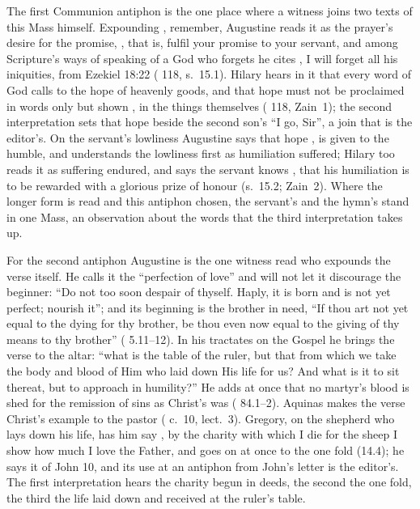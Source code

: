 The first Communion antiphon is the one place where a witness joins two texts
of this Mass himself. Expounding , remember, Augustine reads it as the
prayer's desire for the promise, ,
that is, fulfil your promise to your servant, and among Scripture's ways of
speaking of a God who forgets he cites , I will forget all his iniquities, from Ezekiel 18:22
( 118, s.~15.1). Hilary hears in it that
every word of God calls to the hope of heavenly goods, and that hope must not
be proclaimed in words only but shown , in the things
themselves ( 118, Zain~1); the second
interpretation sets that hope beside the second son's ``I go, Sir'', a join that
is the editor's. On the servant's lowliness Augustine says that hope
, is given to the humble, and understands the
lowliness first as humiliation suffered; Hilary too reads it as suffering
endured, and says the servant knows , that his humiliation is to be rewarded with a
glorious prize of honour (s.~15.2; Zain~2). Where the
longer form is read and this antiphon chosen, the servant's
 and the hymn's  stand in one
Mass, an observation about the words
that the third interpretation takes up.

For the second antiphon Augustine is the one witness read who expounds the
verse itself. He calls it the ``perfection of love'' and will not let it discourage
the beginner: ``Do not too soon despair of thyself. Haply, it is born and is
not yet perfect; nourish it''; and its beginning is the brother in need, ``If
thou art not yet equal to the dying for thy brother, be thou even now equal to
the giving of thy means to thy brother'' ( 5.11--12). In his tractates on the Gospel he brings the verse to the
altar: ``what is the table of the ruler, but that from which we take the body
and blood of Him who laid down His life for us? And what is it to sit thereat,
but to approach in humility?'' He adds at once that no martyr's blood is shed
for the remission of sins as Christ's was ( 84.1--2).
Aquinas makes the verse Christ's example to the pastor (
c.~10, lect.~3). Gregory, on the shepherd who lays down his life, has him say
, by
the charity with which I die for the sheep I show how much I love the Father,
and goes on at once to the one fold (14.4); he says it of John 10, and its use
at an antiphon from John's letter is the editor's. The first interpretation
hears the charity begun in deeds, the second the one fold, the third the life
laid down and received at the ruler's table.

